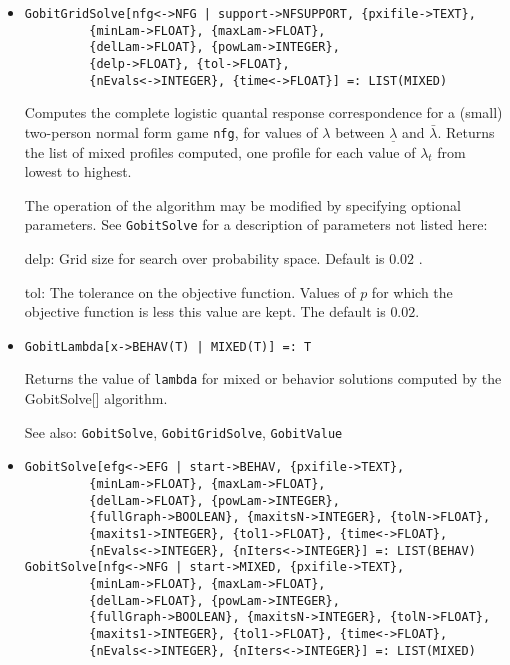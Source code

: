 \begin{itemize}

\item
\protect \large \begin{verbatim}
GobitGridSolve[nfg<->NFG | support->NFSUPPORT, {pxifile->TEXT},
         {minLam->FLOAT}, {maxLam->FLOAT}, 
         {delLam->FLOAT}, {powLam->INTEGER}, 
         {delp->FLOAT}, {tol->FLOAT},
         {nEvals<->INTEGER}, {time<->FLOAT}] =: LIST(MIXED)
\end{verbatim}\normalsize

\bd
Computes the complete logistic quantal response correspondence for
a (small) two-person normal form game \verb+nfg+, for values of
$\lambda$ between $\underline{\lambda}$ and $\bar{\lambda}.$ Returns
the list of mixed profiles computed, one profile for each value of
$\lambda_t$ from lowest to highest.

The operation of the algorithm may be modified by specifying optional
parameters.  See {\tt GobitSolve} for a description of parameters
not listed here:
\bd
\item
[delp:] Grid size for search over probability space.  Default is $0.02$ .
\item
[tol:] The tolerance on the objective function.  Values of $p$ for
which the objective function is less this value are kept.  The default
is $0.02$.  
\ed
\ed

\item
\protect \large \begin{verbatim}
GobitLambda[x->BEHAV(T) | MIXED(T)] =: T
\end{verbatim}\normalsize

\bd
Returns the value of \verb+lambda+ for mixed or behavior solutions
computed by the GobitSolve[] algorithm. 
\item
[See also:] {\tt GobitSolve}, {\tt GobitGridSolve}, {\tt GobitValue}
\ed

\item
\protect \large \begin{verbatim}
GobitSolve[efg<->EFG | start->BEHAV, {pxifile->TEXT},
         {minLam->FLOAT}, {maxLam->FLOAT},
         {delLam->FLOAT}, {powLam->INTEGER},
         {fullGraph->BOOLEAN}, {maxitsN->INTEGER}, {tolN->FLOAT},
         {maxits1->INTEGER}, {tol1->FLOAT}, {time<->FLOAT},
         {nEvals<->INTEGER}, {nIters<->INTEGER}] =: LIST(BEHAV)
GobitSolve[nfg<->NFG | start->MIXED, {pxifile->TEXT},
         {minLam->FLOAT}, {maxLam->FLOAT},
         {delLam->FLOAT}, {powLam->INTEGER},
         {fullGraph->BOOLEAN}, {maxitsN->INTEGER}, {tolN->FLOAT},
         {maxits1->INTEGER}, {tol1->FLOAT}, {time<->FLOAT},
         {nEvals<->INTEGER}, {nIters<->INTEGER}] =: LIST(MIXED)
\end{verbatim}\normalsize


\end{itemize}
